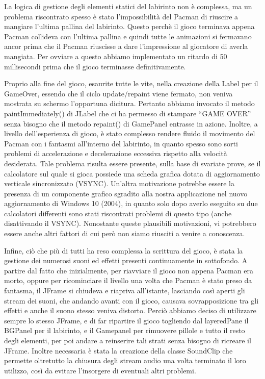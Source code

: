\documentclass[12pt,a4paper]{report}
\begin{document}
La logica di gestione degli elementi statici del labirinto non è complessa, ma un problema riscontrato spesso è stato l’impossibilità del Pacman di riuscire a mangiare l’ultima pallina del labirinto. Questo perchè il gioco terminava appena Pacman collideva con l’ultima pallina e quindi tutte le animazioni si fermavano ancor prima che il Pacman riuscisse a dare l’impressione al giocatore di averla mangiata. Per ovviare a questo abbiamo implementato un ritardo di 50 millisecondi prima che il gioco terminasse definitivamente.

Proprio alla fine del gioco, esaurite tutte le vite, nella creazione della Label per il GameOver, essendo che il ciclo update/repaint viene fermato, non veniva mostrata su schermo l’opportuna dicitura. Pertanto abbiamo invocato il metodo paintImmediately() di JLabel che ci ha permesso di stampare “GAME OVER” senza bisogno che il metodo repaint() di GamePanel entrasse in azione.
Inoltre, a livello dell’esperienza di gioco, è stato complesso rendere fluido il movimento del Pacman con i fantasmi all’interno del labirinto, in quanto spesso sono sorti problemi di accelerazione e decelerazione eccessiva rispetto alla velocità desiderata. Tale problema risulta essere presente, sulla base di svariate prove, se il calcolatore sul quale si gioca possiede una scheda grafica dotata di aggiornamento verticale sincronizzato (VSYNC). Un’altra motivazione potrebbe essere la presenza di un componente grafico sgradito alla nostra applicazione nel nuovo aggiornamento di Windows 10 (2004), in quanto solo dopo averlo eseguito su due calcolatori differenti sono stati riscontrati problemi di questo tipo (anche disattivando il VSYNC). Nonostante queste plausibili motivazioni, vi potrebbero essere anche altri fattori di cui però non siamo riusciti a venire a conoscenza.

Infine, ciò che più di tutti ha reso complessa la scrittura del gioco, è stata la gestione dei numerosi suoni ed effetti presenti continuamente in sottofondo. 
A partire dal fatto che inizialmente, per riavviare il gioco non appena Pacman era morto, oppure per ricominciare il livello una volta che Pacman è stato preso da fantasma, il JFrame si chiudeva e riapriva all’istante, lasciando così aperti gli stream dei suoni, che andando avanti con il gioco, causava sovrapposizione tra gli effetti e anche il suono stesso veniva distorto. Perciò abbiamo deciso di utilizzare sempre lo stesso JFrame, e di far ripartire il gioco togliendo dal layeredPane il BGPanel per il labirinto, e il Gamepanel per rimuovere pillole e tutto il resto degli elementi, per poi andare a reinserire tali strati senza bisogno di ricreare il JFrame. Inoltre necessaria è stata la creazione della classe SoundClip che permette oltretutto la chiusura degli stream audio una volta terminato il loro utilizzo, così da evitare l’insorgere di eventuali altri problemi.
\end{document}
